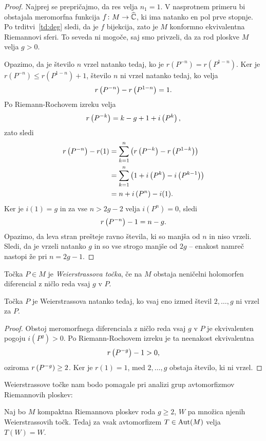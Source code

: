 \begin{proof}
Najprej se prepričajmo, da res velja $n_1 = 1$. V nasprotnem
primeru bi obstajala meromorfna funkcija $f \colon M \to \widehat{\mathbb{C}}$, ki
ima natanko en pol prve stopnje. Po trditvi~\ref{td:deg} sledi, da
je $f$ bijekcija, zato je $M$ konformno ekvivalentna Riemannovi
sferi. To seveda ni mogoče, saj smo privzeli, da za rod ploskve $M$
velja $g > 0$.

Opazimo, da je število $n$ vrzel natanko tedaj, ko je
$r(P^{-n}) = r(P^{1-n})$. Ker je $r(P^{-n}) \leq r(P^{1-n}) + 1$,
število $n$ ni vrzel natanko tedaj, ko velja
\[
r \left(P^{-n}\right) - r \left(P^{1-n}\right) = 1.
\]
Po Riemann-Rochovem izreku velja
\[
r \left(P^{-k}\right) = k-g+1 + i \left(P^k\right),
\]
zato sledi
\begin{align*}
r \left(P^{-n}\right) - r(1) &=
\sum_{k=1}^n \left(r \left(P^{-k}\right) - r \left(P^{1-k}\right)\right)
\\
&=
\sum_{k=1}^n \left(1 + i \left(P^k\right) - i \left(P^{k-1}\right)\right)
\\
&=
n + i \left(P^n\right) - i(1).
\end{align*}
Ker je $i(1) = g$ in za vse $n > 2g-2$ velja $i(P^n) = 0$, sledi
\[
r \left(P^{-n}\right) - 1 = n - g.
\]
Opazimo, da leva stran prešteje ravno števila, ki so manjša od $n$
in niso vrzeli. Sledi, da je vrzeli natanko $g$ in so vse strogo
manjše od $2g$ -- enakost namreč nastopi že pri $n = 2g - 1$.
\end{proof}

\begin{definicija}
Točka $P \in M$ je \emph{Weierstrassova točka}, če na $M$ obstaja
neničelni holomorfen diferencial z ničlo reda vsaj $g$ v
$P$.
\end{definicija}

\begin{trditev}
Točka $P$ je Weierstrassova natanko tedaj, ko vsaj eno izmed števil
$2, \dots, g$ ni vrzel za $P$.
\end{trditev}

\begin{proof}
Obstoj meromorfnega diferenciala z ničlo reda vsaj $g$ v $P$ je
ekvivalenten pogoju $i(P^g) > 0$. Po Riemann-Rochovem izreku je ta
neenakost ekvivalentna
\[
r \left(P^{-g}\right) - 1 > 0,
\]
oziroma $r \left(P^{-g}\right) \geq 2$. Ker je $r(1) = 1$, med
$2, \dots, g$ obstaja število, ki ni vrzel.
\end{proof}

Weierstrassove točke nam bodo pomagale pri analizi grup
avtomorfizmov Riemannovih ploskev:

\begin{lema}
\label{lm:perm_wei}
Naj bo $M$ kompaktna Riemannova ploskev roda $g \geq 2$, $W$ pa
množica njenih Weierstrassovih točk. Tedaj za vsak avtomorfizem
$T \in \operatorname{Aut}(M)$ velja $T(W) = W$.
\end{lema}

